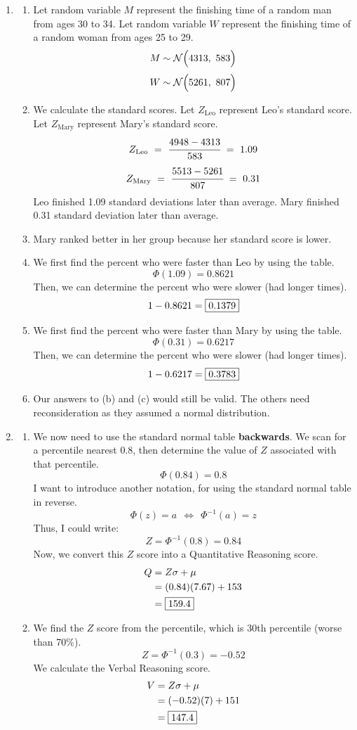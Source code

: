 \documentclass[12pt,letterpaper]{article}
\begin{document}
\begin{enumerate}
\item \begin{enumerate}
\item Let random variable $M$ represent the finishing time of a random man from ages 30 to 34. Let random variable $W$ represent the finishing time of a random woman from ages 25 to 29.
$$M \sim \mathcal{N}\Big(4313,~ 583\Big)$$ 
$$W \sim \mathcal{N}\Big(5261,~ 807\Big)$$ 
\newcommand{\zl}{Z_{\text{Leo}}}
\newcommand{\zm}{Z_{\text{Mary}}}
\item We calculate the standard scores. Let $\zl$ represent Leo's standard score. Let $\zm$ represent Mary's standard score.
$$\zl ~=~ \cfrac{4948-4313}{583} ~=~ 1.09$$
$$\zm ~=~ \cfrac{5513-5261}{807} ~=~ 0.31$$
Leo finished 1.09 standard deviations later than average. Mary finished 0.31 standard deviation later than average.
\item Mary ranked better in her group because her standard score is lower.
\item We first find the percent who were faster than Leo by using the table.
$$\Phi(1.09) = 0.8621 $$
Then, we can determine the percent who were slower (had longer times).
$$1-0.8621 = \fbox{0.1379} $$
\item We first find the percent who were faster than Mary by using the table.
$$\Phi(0.31) = 0.6217 $$
Then, we can determine the percent who were slower (had longer times).
$$1-0.6217 = \fbox{0.3783} $$
\item Our answers to (b) and (c) would still be valid. The others need reconsideration as they assumed a normal distribution.
\end{enumerate}

\newpage
\item \begin{enumerate}
\item We now need to use the standard normal table {\bf backwards}. We scan for a percentile nearest 0.8, then determine the value of $Z$ associated with that percentile.
$$\Phi(0.84) = 0.8 $$
I want to introduce another notation, for using the standard normal table in reverse.
$$\Phi(z) = a  ~~\iff ~~ \Phi^{-1}(a) = z $$
Thus, I could write:
$$Z = \Phi^{-1}(0.8) = 0.84 $$
Now, we convert this $Z$ score into a Quantitative Reasoning score.
\begin{align*}
Q &= Z\sigma + \mu \\
  &= (0.84)(7.67) + 153\\
  &= \fbox{159.4}
\end{align*}
\item We find the $Z$ score from the percentile, which is 30th percentile (worse than 70\%).
$$Z = \Phi^{-1}(0.3) = -0.52$$
We calculate the Verbal Reasoning score.
\begin{align*}
V &= Z\sigma + \mu \\
  &= (-0.52)(7) + 151\\
  &= \fbox{147.4}
\end{align*}
\end{enumerate}


\end{enumerate}
\end{document}
